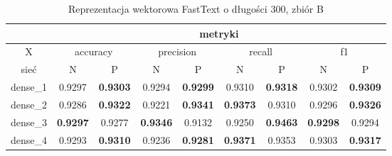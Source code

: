 \begin{table}[p]  \centering
    \caption{Reprezentacja wektorowa FastText o długości 300, zbiór B}
    \label{tab:wyniki_fasttext_B}
    \begin{tabular} {|c|c|c|c|c|c|c|c|c| }    \hline
                 & \multicolumn{8}{c|}{metryki}                                                                                                                                                                                                                                                \\ \hline
        X        & \multicolumn{2}{c|}{accuracy} & \multicolumn{2}{c|}{precision}      & \multicolumn{2}{c|}{recall}    & \multicolumn{2}{c|}{f1}                                                                                                                                              \\ \hline
        sieć     & N                             & P                                   & N                              & P                              & N                          & P                                   & N                          & P                                   \\ \hline
        dense\_1 & 0.9297                        & \textbf{0.9303}                     & 0.9294                         & \textbf{0.9299}                & 0.9310                     & \textbf{0.9318}                     & 0.9302                     & \textbf{0.9309}                     \\ \hline
        dense\_2 & 0.9286                        & \textbf{0.9322}                     & 0.9221                         & \textbf{0.9341}                & \textbf{0.9373}            & 0.9310                              & 0.9296                     & \textbf{0.9326}                     \\ \hline
        dense\_3 & \textbf{0.9297}               & 0.9277                              & \textbf{0.9346}                & 0.9132                         & 0.9250                     & \textbf{0.9463}                     & \textbf{0.9298}            & 0.9294                              \\ \hline
        dense\_4 & 0.9293                        & \textbf{0.9310}                     & 0.9236                         & \textbf{0.9281}                & \textbf{0.9371}            & 0.9353                              & 0.9303                     & \textbf{0.9317}                     \\ \hline

\end{tabular}
\end{table}
